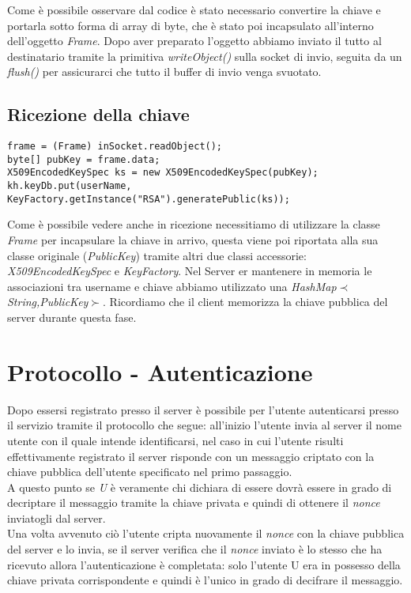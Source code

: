 \documentclass[12pt]{report}
\begin{document}
Come è possibile osservare dal codice è stato necessario convertire la chiave e portarla sotto forma di array di byte, che è stato poi incapsulato all'interno dell'oggetto \textit{Frame}. Dopo aver preparato l'oggetto abbiamo inviato il tutto al destinatario tramite la primitiva \textit{writeObject()} sulla socket di invio, seguita da un \textit{flush()} per assicurarci che tutto il buffer di invio venga svuotato.

\subsection*{Ricezione della chiave}

\begin{lstlisting}
frame = (Frame) inSocket.readObject();
byte[] pubKey = frame.data;                 
X509EncodedKeySpec ks = new X509EncodedKeySpec(pubKey);	
kh.keyDb.put(userName, KeyFactory.getInstance("RSA").generatePublic(ks));
\end{lstlisting}

Come è possibile vedere anche in ricezione necessitiamo di utilizzare la classe \textit{Frame} per incapsulare la chiave in arrivo, questa viene poi riportata alla sua classe originale (\textit{PublicKey}) tramite altri due classi accessorie: \textit{X509EncodedKeySpec} e \textit{KeyFactory}.
Nel Server er mantenere in memoria le associazioni tra username e chiave abbiamo utilizzato una \textit{HashMap$\prec$String,PublicKey$\succ$}. Ricordiamo che il client memorizza la chiave pubblica del server durante questa fase.

\section*{Protocollo - Autenticazione}

Dopo essersi registrato presso il server è possibile per l'utente autenticarsi presso il servizio tramite il protocollo che segue: all'inizio l'utente invia al server il nome utente con il quale intende identificarsi, nel caso in cui l'utente risulti effettivamente registrato il server risponde con un messaggio criptato con la chiave pubblica dell'utente specificato nel primo passaggio.\\
A questo punto se \textit{U} è veramente chi dichiara di essere dovrà essere in grado di decriptare il messaggio tramite la chiave privata e quindi di ottenere il \textit{nonce} inviatogli dal server.\\
Una volta avvenuto ciò l'utente cripta nuovamente il \textit{nonce} con la chiave pubblica del server e lo invia, se il server verifica che il \textit{nonce} inviato è lo stesso che ha ricevuto allora l'autenticazione è completata: solo l'utente U era in possesso della chiave privata corrispondente e quindi è l'unico in grado di decifrare il messaggio.
\end{document}
